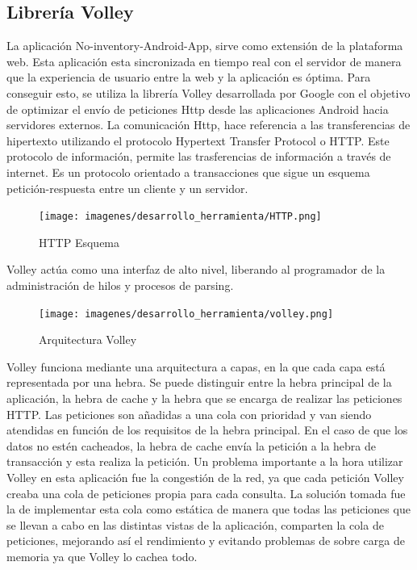 \documentclass[a4paper,11pt]{book}
\begin{document}
\subsection{Librería Volley}
La aplicación No-inventory-Android-App, sirve como extensión de la plataforma web. Esta aplicación esta sincronizada en tiempo real con el servidor de manera que la experiencia de usuario entre la web y la aplicación es óptima.  Para conseguir esto, se utiliza la librería Volley\cite{volley} desarrollada por Google con el objetivo de optimizar el envío de peticiones Http desde las aplicaciones Android hacia servidores externos. La comunicación Http, hace referencia a las transferencias de hipertexto utilizando el protocolo Hypertext Transfer Protocol o HTTP\cite{http}. Este protocolo de información, permite las trasferencias de información a través de internet. Es un protocolo orientado a transacciones que sigue un esquema petición-respuesta entre un cliente y un servidor. 

\begin{figure}[H] 
\centering 
\texttt{[image: imagenes/desarrollo\_herramienta/HTTP.png]}
\caption{ HTTP Esquema\cite{httpD}}
\end{figure}

Volley actúa como una interfaz de alto nivel, liberando al programador de la administración de hilos y procesos de parsing. 


\begin{figure}[H] 
\centering 
\texttt{[image: imagenes/desarrollo\_herramienta/volley.png]}
\caption{ Arquitectura Volley\cite{volley2}}
\end{figure}

Volley funciona mediante una arquitectura a capas, en la que cada capa está representada por una hebra. Se puede distinguir entre la hebra principal de la aplicación, la hebra de cache y la hebra que se encarga de realizar las peticiones HTTP.  Las peticiones son añadidas a una cola con prioridad y van siendo atendidas en función de los requisitos de la hebra principal. En el caso de que los datos no estén cacheados, la hebra de cache envía la petición a la hebra de transacción y esta realiza la petición. Un problema importante a la hora utilizar Volley en esta aplicación fue la congestión de la red, ya que cada petición Volley creaba una cola de peticiones propia para cada consulta. La solución tomada fue la de implementar esta cola como estática de manera que todas las peticiones que se llevan a cabo en las distintas vistas de la aplicación, comparten la cola de peticiones, mejorando así el rendimiento y evitando problemas de sobre carga de memoria ya que Volley lo cachea todo. 
\end{document}
